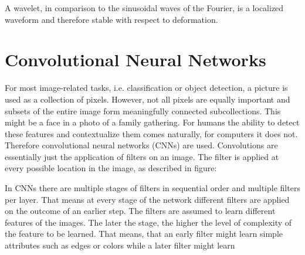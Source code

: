 A wavelet, in comparison to the sinusoidal waves of the Fourier, is a localized waveform and therefore stable with respect to deformation. 


\section{Convolutional Neural Networks}


For most image-related tasks, i.e. classification or object detection, a picture is used as a collection of pixels. However, not all pixels are equally important and subsets of the entire image form meaningfully connected subcollections. This might be a face in a photo of a family gathering. For humans the ability to detect these features and contextualize them comes naturally, for computers it does not. Therefore convolutional neural networks (CNNs) are used. Convolutions are essentially just the application of filters on an image. The filter is applied at every possible location in the image, as described in figure: 


In CNNs there are multiple stages of filters in sequential order and multiple filters per layer. That means at every stage of the network different filters are applied on the outcome of an earlier step. The filters are assumed to learn different features of the images. The later the stage, the higher the level of complexity of the feature to be learned. That means, that an early filter might learn simple attributes such as edges or colors while a later filter might learn 




